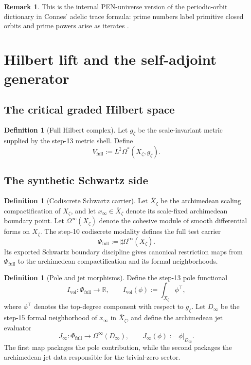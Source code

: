 \documentclass[11pt,a4paper]{article}
\theoremstyle{plain}
\theoremstyle{definition}
\newtheorem{definition}[theorem]{Definition}
\newtheorem{remark}[theorem]{Remark}
\newcommand{\R}{\mathbb{R}}
\newcommand{\sharpop}{\sharp}
\begin{document}
\begin{remark}
This is the internal PEN-universe version of the periodic-orbit dictionary in Connes' adelic trace formula: prime numbers label primitive closed orbits and prime powers arise as iterates \citep{connes-zeta,connes-weil}.
\end{remark}

\section{Hilbert lift and the self-adjoint generator}
\label{sec:hilbert-flow}

\subsection{The critical graded Hilbert space}

\begin{definition}[Full Hilbert complex]
Let $g_{\zeta}$ be the scale-invariant metric supplied by the step-13 metric shell. Define
\[
  V_{\mathrm{full}}:=L^2\Omega^*(X_{\zeta},g_{\zeta}).
\]
\end{definition}

\subsection{The synthetic Schwartz side}

\begin{definition}[Codiscrete Schwartz carrier]
Let $\overline X_{\zeta}$ be the archimedean scaling compactification of $X_{\zeta}$, and let $x_{\infty}\in \overline X_{\zeta}$ denote its scale-fixed archimedean boundary point. Let $\Omega^{\infty}(X_{\zeta})$ denote the cohesive module of smooth differential forms on $X_{\zeta}$. The step-10 codiscrete modality defines the full test carrier
\[
  \Phi_{\mathrm{full}}:=\sharpop\Omega^{\infty}(X_{\zeta}).
\]
Its exported Schwartz boundary discipline gives canonical restriction maps from $\Phi_{\mathrm{full}}$ to the archimedean compactification and its formal neighborhoods.
\end{definition}

\begin{definition}[Pole and jet morphisms]
Define the step-13 pole functional
\[
  I_{\mathrm{vol}}:\Phi_{\mathrm{full}}\to\R,
  \qquad
  I_{\mathrm{vol}}(\phi):=\int_{X_{\zeta}}\phi^{\top},
\]
where $\phi^{\top}$ denotes the top-degree component with respect to $g_{\zeta}$. Let $D_{\infty}$ be the step-15 formal neighborhood of $x_{\infty}$ in $\overline X_{\zeta}$, and define the archimedean jet evaluator
\[
  J_{\infty}:\Phi_{\mathrm{full}}\to \Omega^{\infty}(D_{\infty}),
  \qquad
  J_{\infty}(\phi):=\phi|_{D_{\infty}}.
\]
The first map packages the pole contribution, while the second packages the archimedean jet data responsible for the trivial-zero sector.
\end{definition}
\end{document}
